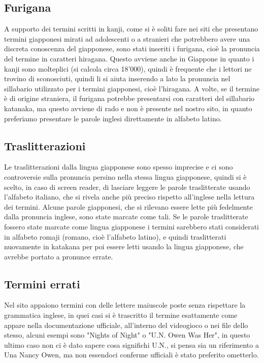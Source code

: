 \documentclass[openany, a4paper, 12pt]{report}
\begin{document}
			\subsection{Furigana}
				A supporto dei termini scritti in kanji, come si è soliti fare nei siti che presentano termini giapponesi mirati ad adolescenti o a stranieri che potrebbero avere una discreta conoscenza del giapponese, sono stati inseriti i furigana, cioè la pronuncia del termine in caratteri hiragana.
				Questo avviene anche in Giappone in quanto i kanji sono molteplici (si calcola circa 18'000), quindi è frequente che i lettori ne trovino di sconosciuti, quindi li si aiuta inserendo a lato la pronuncia nel sillabario utilizzato per i termini giapponesi, cioè l'hiragana.
				A volte, se il termine è di origine straniera, il furigana potrebbe presentarsi con caratteri del sillabario katanaka, ma questo avviene di rado e non è presente nel nostro sito, in quanto preferiamo presentare le parole inglesi direttamente in alfabeto latino. 
			\subsection{Traslitterazioni}
				Le traslitterazioni dalla lingua giapponese sono spesso imprecise e ci sono controversie sulla pronuncia persino nella stessa lingua giapponese, quindi si è scelto, in caso di screen reader, di lasciare leggere le parole traslitterate usando l'alfabeto italiano, che si rivela anche più preciso rispetto all'inglese nella lettura dei termini.
				Alcune parole giapponesi, che si rilevano essere lette più fedelmente dalla pronuncia inglese, sono state marcate come tali.
				Se le parole traslitterate fossero state marcate come lingua giapponese i termini sarebbero stati considerati in alfabeto romaji (romano, cioè l'alfabeto latino), e quindi traslitterati nuovamente in katakana per poi essere letti usando la lingua giapponese, che avrebbe portato a pronunce errate.
			\subsection{Termini errati}
				Nel sito appaiono termini con delle lettere maiuscole poste senza rispettare la grammatica inglese, in quei casi si è trascritto il termine esattamente come appare nella documentazione ufficiale, all'interno del videogioco o nei file dello stesso, alcuni esempi sono "Nights of Night" o "U.N. Owen Was Her", in questo ultimo caso non ci è dato sapere cosa significhi U.N., si pensa sia un riferimento a Una Nancy Owen, ma non essendoci conferme ufficiali è stato preferito ometterlo.\\
\end{document}
